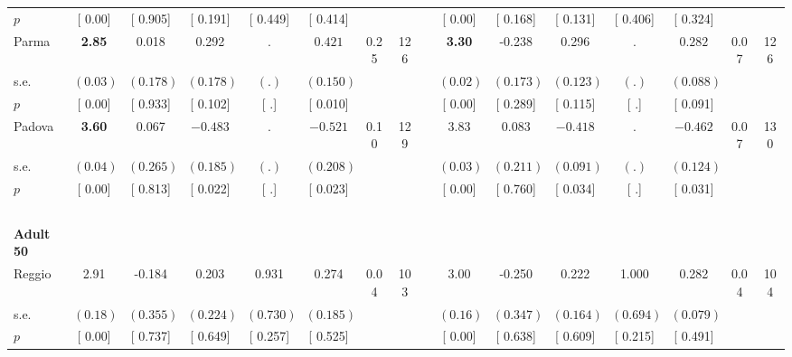 \begin{longtable}{L{8em} c c c c c c c p{1em} c c c c c c c}
\quad \quad \quad \quad $ p$ & [     0.00] & [    0.905] & [    0.191] & [    0.449] & [    0.414] & & & & [     0.00] & [    0.168] & [    0.131] & [    0.406] & [    0.324] & &  \\[1em]
\quad \quad \quad Parma& \textbf{     2.85} &     0.018 &     0.292 &         . & $ \mathbf{    0.421}$ &      0.25 &       126 & & \textbf{     3.30} &    -0.238 &     0.296 &         . & $ \mathbf{    0.282}$ &      0.07 &       126  \\*
\quad \quad \quad \quad s.e.& $ (     0.03)$ & $ (    0.178)$ & $ (    0.178)$ & $ (        .)$ & $ (    0.150)$ & & & & $ (     0.02)$ & $ (    0.173)$ & $ (    0.123)$ & $ (        .)$ & $ (    0.088)$ & &  \\*
\quad \quad \quad \quad $ p$ & [     0.00] & [    0.933] & [    0.102] & [        .] & [    0.010] & & & & [     0.00] & [    0.289] & [    0.115] & [        .] & [    0.091] & &  \\[1em]
\quad \quad \quad Padova& \textbf{     3.60} &     0.067 & $ \mathbf{   -0.483}$ &         . & $ \mathbf{   -0.521}$ &      0.10 &       129 & & 3.83 &     0.083 & $ \mathbf{   -0.418}$ &         . & $ \mathbf{   -0.462}$ &      0.07 &       130  \\*
\quad \quad \quad \quad s.e.& $ (     0.04)$ & $ (    0.265)$ & $ (    0.185)$ & $ (        .)$ & $ (    0.208)$ & & & & $ (     0.03)$ & $ (    0.211)$ & $ (    0.091)$ & $ (        .)$ & $ (    0.124)$ & &  \\*
\quad \quad \quad \quad $ p$ & [     0.00] & [    0.813] & [    0.022] & [        .] & [    0.023] & & & & [     0.00] & [    0.760] & [    0.034] & [        .] & [    0.031] & &  \\[1em]
~\\[1em]
\quad \quad \textbf{Adult 50} & & & & & & & & & & & & & & & \\* 
\quad \quad \quad Reggio& 2.91 &    -0.184 &     0.203 &     0.931 &     0.274 &      0.04 &       103 & & 3.00 &    -0.250 &     0.222 &     1.000 &     0.282 &      0.04 &       104  \\*
\quad \quad \quad \quad s.e.& $ (     0.18)$ & $ (    0.355)$ & $ (    0.224)$ & $ (    0.730)$ & $ (    0.185)$ & & & & $ (     0.16)$ & $ (    0.347)$ & $ (    0.164)$ & $ (    0.694)$ & $ (    0.079)$ & &  \\*
\quad \quad \quad \quad $ p$ & [     0.00] & [    0.737] & [    0.649] & [    0.257] & [    0.525] & & & & [     0.00] & [    0.638] & [    0.609] & [    0.215] & [    0.491] & &  \\[1em]

\end{longtable}
